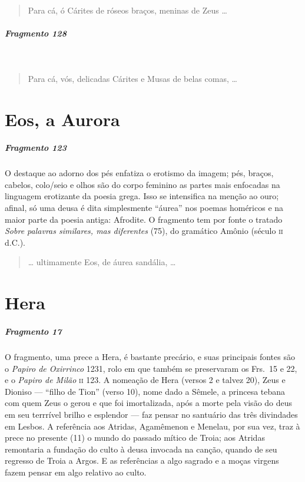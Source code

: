 \begin{verse}
Para cá, ó Cárites de róseos braços, meninas \qb{}de Zeus \ldots{}
\end{verse}

\paragraph{Fragmento 128} \

\begin{verse}
Para cá, vós, delicadas Cárites e Musas de \qb{}belas comas, \ldots{}
\end{verse}


\chapter{Eos, a Aurora}

\paragraph{Fragmento 123}

{\small O destaque ao adorno dos pés enfatiza o erotismo da imagem; pés, braços,
cabelos, colo/seio e olhos são do corpo feminino as partes mais enfocadas na
linguagem erotizante da poesia grega. Isso se intensifica na menção ao ouro;
afinal, só uma deusa é dita simplesmente ``áurea” nos poemas homéricos
e na maior parte da poesia antiga: Afrodite. O fragmento tem por fonte o
tratado \textit{Sobre palavras similares, mas diferentes} (75), do gramático Amônio
(século \textsc{ii} d.C.).}

\begin{verse}
\ldots{} ultimamente Eos, de áurea sandália, \ldots{}
\end{verse}


\chapter{Hera}

\paragraph{Fragmento 17}

{\small O fragmento, uma prece a Hera, é bastante precário, e suas principais fontes são o \textit{Papiro de Oxirrinco} 1231, rolo em que também se preservaram os Frs.~15 e 22, e o \textit{Papiro de Milão} \textsc{ii} 123. A nomeação de Hera (versos 2 e talvez 20), Zeus e Dioniso --- ``filho de Tion'' (verso 10), nome dado a Sêmele, a princesa tebana com quem Zeus o gerou e que foi imortalizada, após a morte pela visão do deus em seu terrrível brilho e esplendor --- faz pensar no santuário das três divindades em Lesbos. A referência aos Atridas, Agamêmenon e Menelau, por sua vez, traz à prece no presente (11) o mundo do passado mítico de Troia; aos Atridas remontaria a fundação do culto à deusa invocada na canção, quando de seu regresso de Troia a Argos. E as referências a algo sagrado e a moças virgens fazem pensar em algo relativo ao culto.}

